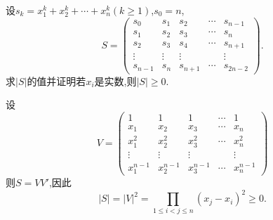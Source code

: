 \documentclass[../../main.tex]{subfiles}%
\begin{document}
\begin{example}
设\(s_k = x_1^k + x_2^k+\cdots+x_n^k(k\geqslant 1)\),\(s_0 = n\),
\[
S = 
\begin{pmatrix}
s_0 & s_1 & s_2 & \cdots & s_{n - 1}\\
s_1 & s_2 & s_3 & \cdots & s_{n}\\
s_2 & s_3 & s_4 & \cdots & s_{n + 1}\\
\vdots & \vdots & \vdots & & \vdots\\
s_{n - 1} & s_{n} & s_{n + 1} & \cdots & s_{2n - 2}
\end{pmatrix}.
\]
求\(|S|\)的值并证明若\(x_i\)是实数,则\(|S|\geqslant 0\).
\end{example}
\begin{solution}

设
\[
V = 
\begin{pmatrix}
1 & 1 & 1 & \cdots & 1\\
x_1 & x_2 & x_3 & \cdots & x_n\\
x_1^2 & x_2^2 & x_3^2 & \cdots & x_n^2\\
\vdots & \vdots & \vdots & & \vdots\\
x_1^{n - 1} & x_2^{n - 1} & x_3^{n - 1} & \cdots & x_n^{n - 1}
\end{pmatrix}
\]
则\(S = VV'\),因此
\[
|S| = |V|^2=\prod_{1\leqslant  i<j\leqslant  n}(x_j - x_i)^2\geqslant 0.
\]

\end{solution}
\end{document}
